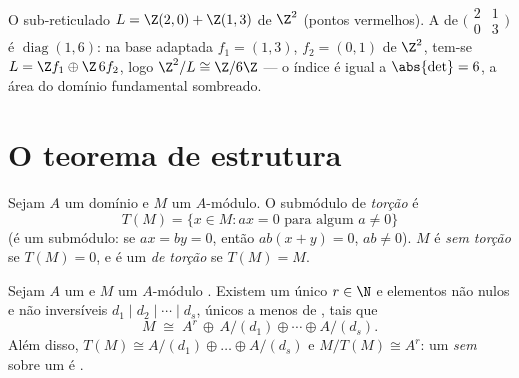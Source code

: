 \begin{omfigure}

{\small O sub-reticulado $L = \Z(2,0) + \Z(1,3)$ de $\Z^2$ (pontos vermelhos). A
 de $\bigl(\begin{smallmatrix} 2 &
1\\ 0 & 3\end{smallmatrix}\bigr)$ é $\operatorname{diag}(1, 6)$: na base adaptada $f_1 = (1,3)$, $f_2 = (0,1)$ de
$\Z^2$, tem-se $L = \Z f_1 \oplus \Z\,6f_2$, logo $\Z^2/L \cong \Z/6\Z$ --- o índice é igual a $\abs{\det} = 6$, a
área do domínio fundamental sombreado.}
\end{omfigure}

\section{O teorema de estrutura}

\begin{definition}\label{def:b3:modules:torsion}
Sejam $A$ um domínio e $M$ um $A$-módulo. O submódulo de
\emph{torção} é
\[
T(M) = \{x \in M : ax = 0 \text{ para algum } a \neq 0\}
\]
(é um submódulo: se $ax = by = 0$, então $ab(x + y) = 0$, $ab \ne 0$). $M$ é \emph{sem
torção} se $T(M) = 0$, e é um \emph{ de torção} se $T(M) = M$.
\end{definition}

\begin{theorem}\label{thm:b3:modules:structure}
Sejam $A$ um  e $M$ um $A$-módulo .
Existem um único $r \in \N$ e elementos não nulos e não inversíveis $d_1 \mid d_2 \mid
\cdots \mid d_s$,
únicos a menos de , tais que
\[
M \;\cong\; A^r \,\oplus\, A/(d_1) \oplus \cdots \oplus A/(d_s).
\]
Além disso, $T(M) \cong A/(d_1)\oplus\dots\oplus A/(d_s)$ e $M/T(M)
\cong A^r$: um  \emph{sem
} sobre um  é .
\end{theorem}

